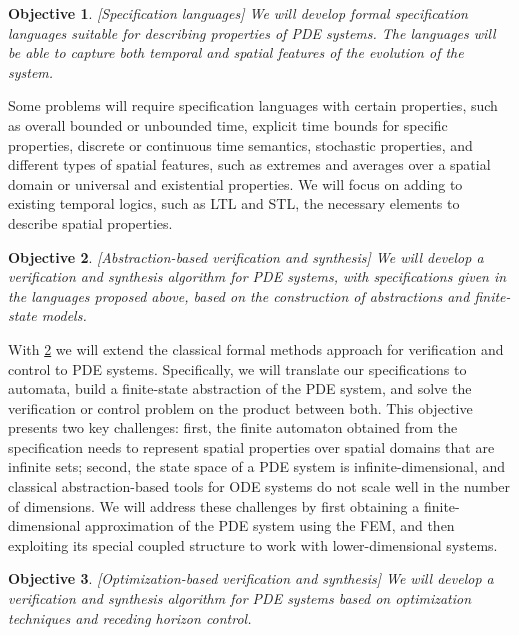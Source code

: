 \documentclass{article}
\newtheorem{objective}{Objective}
\begin{document}
\begin{objective} \label{obj:spec}
    [Specification languages] We will develop formal specification languages
    suitable for describing properties of PDE systems. The languages will be
    able to capture both temporal and spatial features of the evolution of the
    system.
\end{objective}

Some problems will require specification languages with certain properties, such
as overall bounded or unbounded time, explicit time bounds for specific
properties, discrete or continuous time semantics, stochastic properties, and
different types of spatial features, such as extremes and averages over
a spatial domain or universal and existential properties. We will focus on
adding to existing temporal logics, such as LTL and STL, the necessary elements
to describe spatial properties. 

\begin{objective} \label{obj:abst_based}
    [Abstraction-based verification and synthesis] We will develop a
    verification and synthesis algorithm for PDE systems, with specifications
    given in the languages proposed above, based on the construction of
    abstractions and finite-state models.
\end{objective}

With \cref{obj:abst_based} we will extend the classical formal methods approach
for verification and control to PDE systems. Specifically, we will translate
our specifications to automata, build a finite-state abstraction of the PDE
system, and solve the verification or control problem on the product between
both. This objective presents two key challenges: first, the finite automaton
obtained from the specification needs to represent spatial properties over
spatial domains that are infinite sets; second, the state space of a PDE system
is infinite-dimensional, and classical abstraction-based
tools for ODE systems do not scale well in the number of dimensions. We will
address these challenges by first obtaining a finite-dimensional approximation
of the PDE system using the FEM, and then exploiting its special coupled
structure to work with lower-dimensional systems.

\begin{objective} \label{obj:opt_based}
    [Optimization-based verification and synthesis] We will develop a
    verification and synthesis algorithm for PDE systems based on optimization
    techniques and receding horizon control.
\end{objective}
\end{document}
